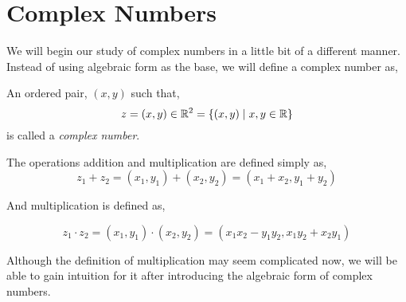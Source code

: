\chapter{Complex Numbers}

We will begin our study of complex numbers in a little bit of a 
different manner. Instead of using algebraic form as the base, we will
define a complex number as,


\begin{definition}
    An ordered pair, \((x, y)\) such that,
    \[
        z = (x, y) \in \mathbb R^2 = \left\{(x, y) \mid x, y \in \mathbb R \right\}
    \]
    is called a \emph{complex number}.
\end{definition}


The operations addition and multiplication are defined simply as, 
\[
    z_1 + z_2 = (x_1, y_1) + (x_2, y_2) = (x_1 + x_2, y_1 + y_2)
\]

And multiplication is defined as,

\[
    z_1 \cdot z_2 = (x_1, y_1) \cdot (x_2, y_2) = (x_1x_2 - y_1y_2, x_1y_2 + x_2y_1)
\]

Although the definition of multiplication may seem complicated now, we will be able
to gain intuition for it after introducing the algebraic form of complex numbers.